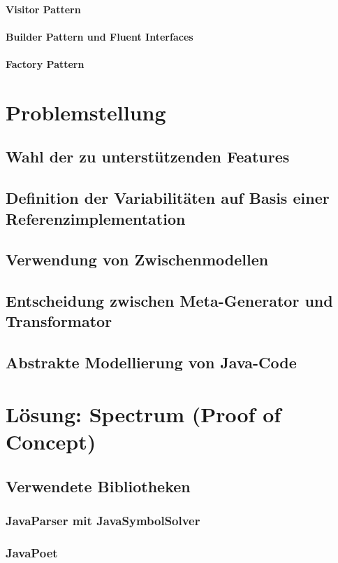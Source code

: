 \documentclass[12pt,oneside,a4paper,parskip]{scrbook}
\begin{document}
\subsubsection{Visitor Pattern}
\subsubsection{Builder Pattern und Fluent Interfaces}
\subsubsection{Factory Pattern}

\chapter{Problemstellung}
\section{Wahl der zu unterstützenden Features}
\section{Definition der Variabilitäten auf Basis einer Referenzimplementation}
\section{Verwendung von Zwischenmodellen}
\section{Entscheidung zwischen Meta-Generator und Transformator}
\section{Abstrakte Modellierung von Java-Code}

\chapter{Lösung: Spectrum (Proof of Concept)}
\section{Verwendete Bibliotheken}
\subsection{JavaParser mit JavaSymbolSolver}
\subsection{JavaPoet}
\end{document}
